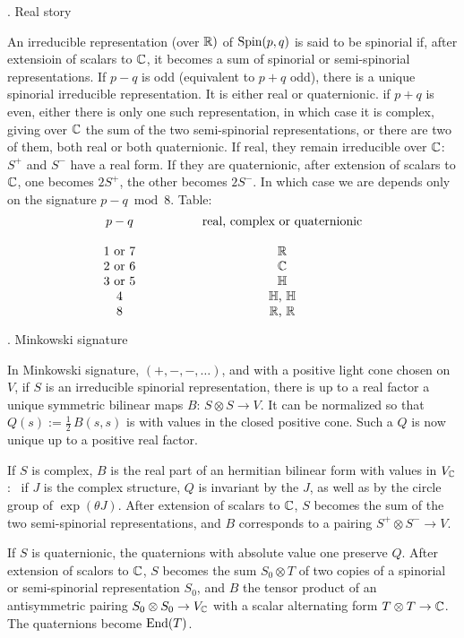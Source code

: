 \bigskip
{}. Real story
\endsubhead

An irreducible representation (over ${\Bbb R})$ of
$\text{\rm Spin}(p,q)$ is said to be spinorial if, after extensioin
of scalars to ${\Bbb C}$, it becomes a sum of spinorial or
semi-spinorial representations.
If $p-q$ is odd (equivalent to $p+q$ odd), there is a
unique spinorial irreducible representation.
It is either real or quaternionic.
if $p+q$ is even, either there is only one such
representation, in which case it is complex, giving over
${\Bbb C}$ the sum of the two semi-spinorial representations,
or there are two of them, both real or both quaternionic.
If real, they remain irreducible over ${\Bbb C}$: \
$S^{\plus}$ and $S^-$ have a real form.
If they are quaternionic, after extension of scalars to
${\Bbb C}$, one becomes $2S^{\plus}$, the other becomes
$2S^-$.
In which case we are depends only on the signature
$p-q\bmod{8}$.
Table:
$$
\vbox{\tabskip=50pt
\halign{\hfill #\hfill &\hfill #\hfill\cr
$p-q$ &real, complex or quaternionic\cr
\noalign{\bigskip}
$1$ or $7$ &$\dbR$\cr
$2$ or $6$ &$\dbC$\cr
$3$ or $5$ &$\dbH$\cr
$4$ &$\dbH$, $\dbH$\cr
$8$ &$\dbR$, $\dbR$\cr}}
$$

\bigskip
{}. Minkowski signature
\endsubhead

In Minkowski signature, $(+, -, -, \ldots)$, and with a
positive light cone chosen on $V$, if $S$ is an
irreducible spinorial representation, there is up to a
real factor a unique symmetric bilinear maps $B\colon\,
S\otimes S\to V$.
It can be normalized so that $Q(s):= \frac12\,B(s,s)$ is
with values in the closed positive cone.
Such a $Q$  is now unique up to a positive real factor.

If $S$ is complex, $B$ is the real part of an hermitian
bilinear form with values in $V_{{\Bbb C}}$: \ if $J$ is the
complex structure, $Q$ is invariant by the $J$, as well
as by the circle group of $\exp(\theta J)$.
After extension of scalars to ${\Bbb C}$, $S$ becomes the sum
of the two semi-spinorial representations, and $B$
corresponds to a pairing $S^{\plus}\otimes S^-\to V$.

If $S$ is quaternionic, the quaternions with absolute
value one preserve $Q$.
After extension of scalors to ${\Bbb C}$, $S$ becomes the sum
$S_0\otimes T$ of two copies of a spinorial or
semi-spinorial representation $S_0$, and $B$ the tensor
product of an antisymmetric pairing $S_0\otimes S_0\to
V_{{\Bbb C}}$ with a scalar alternating form $T\otimes
T\to{\Bbb C}$.
The quaternions become $\text{\rm End}(T)$.

